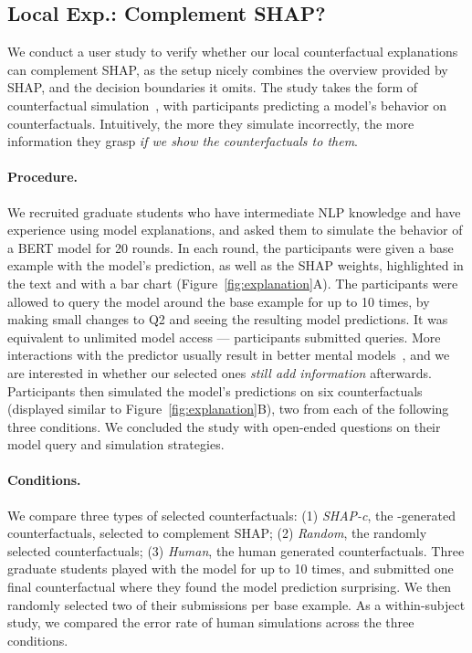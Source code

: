 \subsection{Local Exp.: Complement SHAP?}
We conduct a user study to verify whether our local counterfactual explanations can complement SHAP, as the setup nicely combines the overview provided by SHAP, and the decision boundaries it omits.
The study takes the form of counterfactual simulation~\cite{hase2020evaluating}, with participants predicting a model's behavior on counterfactuals.
Intuitively, the more they simulate incorrectly, the more information they grasp \emph{if we show the counterfactuals to them}.

\paragraph{Procedure.}
We recruited  graduate students who have intermediate NLP knowledge and have experience using model explanations, and asked them to simulate the behavior of a \qqp BERT model for 20 rounds.
In each round, the participants were given a base example with the model's prediction, as well as the SHAP weights, highlighted in the text and with a bar chart (Figure~\ref{fig:explanation}A).
The participants were allowed to query the model around the base example for up to 10 times, by making small changes to Q2 and seeing the resulting model predictions.
It was equivalent to unlimited model access --- participants submitted  queries.
More interactions with the predictor usually result in better mental models~\cite{miller}, and we are interested in whether our selected ones \emph{still add information} afterwards.
Participants then simulated the model's predictions on six counterfactuals (displayed similar to Figure~\ref{fig:explanation}B), two from each of the following three conditions.
We concluded the study with open-ended questions on their model query and simulation strategies.



\newcommand{\cshap}{\emph{SHAP-c}\xspace}
\newcommand{\crandom}{\emph{Random}\xspace}
\newcommand{\chuman}{\emph{Human}\xspace}
\paragraph{Conditions.} 
We compare three types of selected counterfactuals:
(1) \cshap, the \sysname-generated counterfactuals, selected to complement SHAP; 
(2) \crandom, the randomly selected \sysname counterfactuals; 
(3) \chuman, the human generated counterfactuals.
Three graduate students played with the model for up to 10 times, and submitted one final counterfactual where they found the model prediction surprising.
We then randomly selected two of their submissions per base example.
As a within-subject study, we compared the error rate of human simulations across the three conditions.





